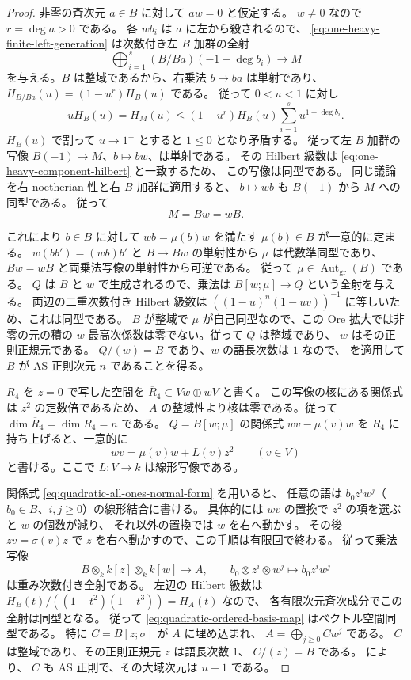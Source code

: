 \documentclass[11pt,a4paper]{ltjsarticle}
\theoremstyle{definition}
\begin{document}
\begin{proof}
非零の斉次元 $a\in B$ に対して $aw=0$ と仮定する。
$w\neq0$ なので $r=\deg a>0$ である。
各 $wb_i$ は $a$ に左から殺されるので、
\eqref{eq:one-heavy-finite-left-generation} は次数付き左 $B$ 加群の全射
\[
 \bigoplus_{i=1}^s(B/Ba)(-1-\deg b_i)\longrightarrow M
\]
を与える。$B$ は整域であるから、右乗法 $b\mapsto ba$ は単射であり、
$H_{B/Ba}(u)=(1-u^r)H_B(u)$ である。
従って $0<u<1$ に対し
\[
 uH_B(u)=H_M(u)
 \leq (1-u^r)H_B(u)\sum_{i=1}^s u^{1+\deg b_i}.
\]
$H_B(u)$ で割って $u\to1^-$ とすると $1\leq0$ となり矛盾する。
従って左 $B$ 加群の写像 $B(-1)\to M$、$b\mapsto bw$、は単射である。
その Hilbert 級数は \eqref{eq:one-heavy-component-hilbert} と一致するため、
この写像は同型である。
同じ議論を右 noetherian 性と右 $B$ 加群に適用すると、
$b\mapsto wb$ も $B(-1)$ から $M$ への同型である。
従って
\[
 M=Bw=wB.
\]

これにより $b\in B$ に対して
$wb=\mu(b)w$ を満たす $\mu(b)\in B$ が一意的に定まる。
$w(bb')=(wb)b'$ と $B\to Bw$ の単射性から $\mu$ は代数準同型であり、
$Bw=wB$ と両乗法写像の単射性から可逆である。
従って $\mu\in\operatorname{Aut}_{\mathrm{gr}}(B)$ である。
$Q$ は $B$ と $w$ で生成されるので、乗法は
$B[w;\mu]\to Q$ という全射を与える。
両辺の二重次数付き Hilbert 級数は
$((1-u)^n(1-uv))^{-1}$ に等しいため、これは同型である。
$B$ が整域で $\mu$ が自己同型なので、この Ore 拡大では非零の元の積の
$w$ 最高次係数は零でない。従って $Q$ は整域であり、
$w$ はその正則正規元である。
$Q/(w)=B$ であり、$w$ の語長次数は $1$ なので、
\cite[Lemma~1.1, Corollary~1.2]{RZ} を適用して
$B$ が AS 正則次元 $n$ であることを得る。

$R_4$ を $z=0$ で写した空間を
$\overline R_4\subset Vw\oplus wV$ と書く。
この写像の核にある関係式は $z^2$ の定数倍であるため、
$A$ の整域性より核は零である。従って
$\dim\overline R_4=\dim R_4=n$ である。
$Q=B[w;\mu]$ の関係式 $wv-\mu(v)w$ を $R_4$ に持ち上げると、一意的に
\[
 wv=\mu(v)w+L(v)z^2\qquad(v\in V)
\]
と書ける。ここで $L:V\to k$ は線形写像である。

関係式 \eqref{eq:quadratic-all-ones-normal-form} を用いると、
任意の語は $b_0z^iw^j$（$b_0\in B$、$i,j\geq0$）の線形結合に書ける。
具体的には $wv$ の置換で $z^2$ の項を選ぶと $w$ の個数が減り、
それ以外の置換では $w$ を右へ動かす。
その後 $zv=\sigma(v)z$ で $z$ を右へ動かすので、この手順は有限回で終わる。
従って乗法写像
\begin{equation}\label{eq:quadratic-ordered-basis-map}
 B\otimes_k k[z]\otimes_k k[w]\longrightarrow A,
 \qquad b_0\otimes z^i\otimes w^j\longmapsto b_0z^iw^j
\end{equation}
は重み次数付き全射である。
左辺の Hilbert 級数は
$H_B(t)/((1-t^2)(1-t^3))=H_A(t)$ なので、
各有限次元斉次成分でこの全射は同型となる。
従って \eqref{eq:quadratic-ordered-basis-map} はベクトル空間同型である。
特に $C=B[z;\sigma]$ が $A$ に埋め込まれ、
$A=\bigoplus_{j\geq0}Cw^j$ である。
$C$ は整域であり、その正則正規元 $z$ は語長次数 $1$、
$C/(z)=B$ である。\cite[Lemma~1.1, Corollary~1.2]{RZ} により、
$C$ も AS 正則で、その大域次元は $n+1$ である。


\end{proof}
\end{document}
